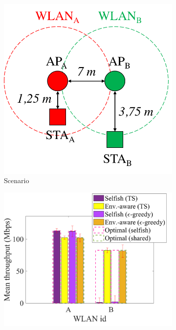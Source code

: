 \documentclass[preprint,12pt]{elsarticle}
\begin{document}
\begin{figure}[h!]
	\centering   		
	\begin{subfigure}[b]{0.26\textwidth}
		\includegraphics[width=\textwidth]{s1_new}
		\caption{Scenario}
		\label{fig:s1_new}
	\end{subfigure}
	\begin{subfigure}[b]{0.36\linewidth}
		\includegraphics[width=\textwidth]{fig_2_1_fairness}

\end{subfigure}
\end{figure}
\end{document}
